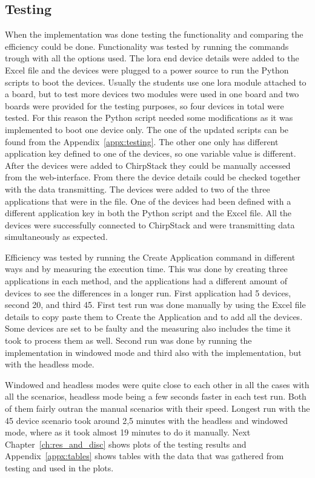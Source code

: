 \clearpage

\subsection{Testing}
When the implementation was done testing the functionality and comparing the efficiency could be done.
Functionality was tested by running the commands trough with all the options used.
The \gls{lora} end device details were added to the Excel file and the devices were plugged to a power source to run the Python scripts to boot the devices.
Usually the students use one \gls{lora} module attached to a board, but to test more devices two modules were used in one board and two boards were provided for the testing purposes, so four devices in total were tested.
For this reason the Python script needed some modifications as it was implemented to boot one device only.
The one of the updated scripts can be found from the Appendix~\ref{appx:testing}.
The other one only has different application key defined to one of the devices, so one variable value is different.
After the devices were added to ChirpStack they could be manually accessed from the web-interface.
From there the device details could be checked together with the data transmitting.
The devices were added to two of the three applications that were in the  file.
One of the devices had been defined with a different application key in both the Python script and the Excel file.
All the devices were successfully connected to ChirpStack and were transmitting data simultaneously as expected.

Efficiency was tested by running the Create Application command in different ways and by measuring the execution time.
This was done by creating three applications in each method, and the applications had a different amount of devices to see the differences in a longer run.
First application had 5 devices, second 20, and third 45.
First test run was done manually by using the Excel file details to copy paste them to Create the Application and to add all the devices.
Some devices are set to be faulty and the measuring also includes the time it took to process them as well.
Second run was done by running the implementation in windowed mode and third also with the implementation, but with the headless mode.

\clearpage

Windowed and headless modes were quite close to each other in all the cases with all the scenarios, headless mode being a few seconds faster in each test run.
Both of them fairly outran the manual scenarios with their speed.
Longest run with the 45 device scenario took around 2,5 minutes with the headless and windowed mode, where as it took almost 19 minutes to do it manually.
Next Chapter~\ref{ch:res_and_disc} shows plots of the testing results and Appendix~\ref{appx:tables} shows tables with the data that was gathered from testing and used in the plots.

\clearpage %
